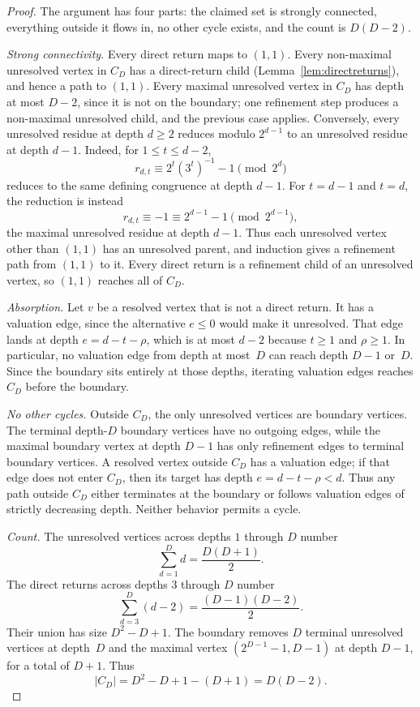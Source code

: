 \documentclass[11pt]{amsart}
\theoremstyle{definition}
\theoremstyle{remark}
\begin{document}
\begin{proof}
The argument has four parts: the claimed set is strongly connected,
everything outside it flows in, no other cycle exists, and the count is $D(D-2)$.

\emph{Strong connectivity.}
Every direct return maps to $(1,1)$.  Every non-maximal unresolved
vertex in $C_D$ has a direct-return child
(Lemma~\ref{lem:directreturns}), and hence a path to $(1,1)$.  Every
maximal unresolved vertex in $C_D$ has depth at most $D-2$, since it
is not on the boundary; one refinement step produces a non-maximal
unresolved child, and the previous case applies. Conversely, every unresolved residue
at depth \(d\ge2\) reduces modulo \(2^{d-1}\) to an unresolved residue at depth \(d-1\).
Indeed, for \(1\le t\le d-2\),
\[
r_{d,t}\equiv 2^t(3^t)^{-1}-1 \pmod{2^d}
\]
reduces to the same defining congruence at depth \(d-1\).  For
\(t=d-1\) and \(t=d\), the reduction is instead
\[
r_{d,t}\equiv -1 \equiv 2^{d-1}-1 \pmod{2^{d-1}},
\]
the maximal unresolved residue at depth \(d-1\).  Thus each unresolved
vertex other than \((1,1)\) has an unresolved parent, and induction gives a
refinement path from \((1,1)\) to it.  Every direct return is a refinement child of an unresolved
vertex, so \((1,1)\) reaches all of \(C_D\).

\emph{Absorption.}
Let $v$ be a resolved vertex that is not a direct return.  It has a valuation edge, since the alternative $e\le0$ would make it unresolved.  That edge lands at depth $e=d-t-\rho$, which is at most $d-2$ because $t\ge1$ and $\rho\ge1$.  In particular, no valuation edge from depth at most~$D$ can reach depth $D-1$ or~$D$.  Since the boundary sits entirely at those depths, iterating valuation edges reaches $C_D$ before the boundary.

\emph{No other cycles.}
Outside \(C_D\), the only unresolved vertices are boundary vertices.  The
terminal depth-\(D\) boundary vertices have no outgoing edges, while the
maximal boundary vertex at depth \(D-1\) has only refinement edges to terminal
boundary vertices.  A resolved vertex outside \(C_D\) has a valuation edge; if
that edge does not enter \(C_D\), then its target has depth
\(e=d-t-\rho<d\).  Thus any path outside \(C_D\) either terminates at the
boundary or follows valuation edges of strictly decreasing depth.  Neither
behavior permits a cycle.

\emph{Count.}
The unresolved vertices across depths $1$ through $D$ number
\[
\sum_{d=1}^{D}d=\frac{D(D+1)}{2}.
\]
The direct returns across depths $3$ through $D$ number
\[
\sum_{d=3}^{D}(d-2)=\frac{(D-1)(D-2)}{2}.
\]
Their union has size $D^2-D+1$.  The boundary removes $D$ terminal unresolved vertices at depth~$D$ and the maximal vertex $(2^{D-1}-1,D-1)$ at depth $D-1$, for a total of $D+1$.  Thus
\[
|C_D|=D^2-D+1-(D+1)=D(D-2).
\]
\end{proof}
\end{document}
